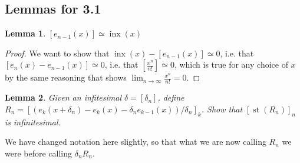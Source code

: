 \documentclass{article}
\DeclareMathOperator{\st}{st}
\DeclareMathOperator{\inx}{inx}
\newtheorem*{lemma}{Lemma}
\theoremstyle{definition}
\begin{document}
\subsection{Lemmas for 3.1}
\begin{lemma}
    $[e_{n-1}(x)] \simeq \inx(x)$
\end{lemma}
\begin{proof}
    We want to show that $\inx(x) - [e_{n-1}(x)] \simeq 0$, i.e. that $[e_n(x) - e_{n-1}(x)] \simeq 0$, i.e. that $\left[\frac{x^n}{n!}\right] \simeq 0$, which is true for any choice of $x$ by the same reasoning that shows $\lim_{n \to \infty} \frac{x^n}{n!} = 0$.
\end{proof}

\begin{lemma}
    Given an infitesimal $\delta = [\delta_n]$, define $R_n = [(e_k(x + \delta_n) - e_k(x) - \delta_n e_{k-1}(x)) / \delta_n]_k$. Show that $[\st(R_n)]_n$ is infinitesimal.
\end{lemma}
We have changed notation here slightly, so that what we are now calling $R_n$ we were before calling $\delta_n R_n$.
\end{document}
